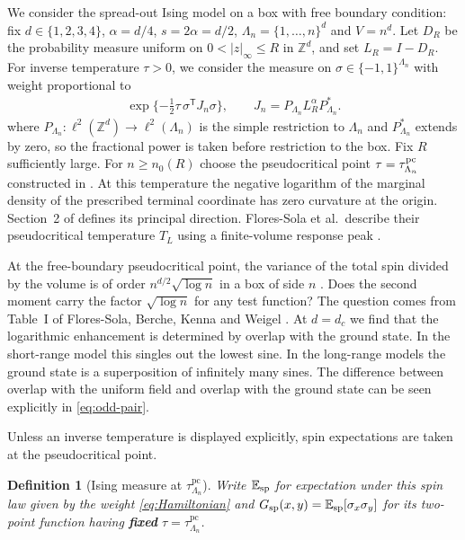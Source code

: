 \documentclass[11pt]{article}
\numberwithin{equation}{section}
\newtheorem{definition}[theorem]{Definition}
\newcommand{\E}{\mathbb E}
\begin{document}
We consider the spread-out Ising model on a box with free boundary condition:
fix $d\in\{1,2,3,4\}$, $\alpha=d/4$, $s=2\alpha=d/2$,
$\Lambda_n=\{1,\ldots,n\}^d$ and $V=n^d$.
Let $D_R$ be the probability measure uniform on $0<|z|_\infty\le R$ in
$\mathbb Z^d$, and set $L_R=I-D_R$.
For inverse temperature $\tau >0$, we consider the measure on $\sigma \in\{-1,1\}^{\Lambda_n}$
with weight proportional to
\begin{align}
 \exp\{-\tfrac12\tau\,\sigma^{\mathsf T}J_n\sigma\},\qquad
 J_n=P_{\Lambda_n} L_R^\alpha P_{\Lambda_n}^* .
 \label{eq:Hamiltonian}
\end{align}
where $P_{\Lambda_n} : \ell^2 (\mathbb{Z}^d) \rightarrow \ell^2 (\Lambda_n)$ 
is the simple restriction to $\Lambda_n$ and $P_{\Lambda_n}^*$ extends by zero, 
so the fractional power is taken before restriction to the box. 
Fix $R$ sufficiently large. 
For $n\ge n_0(R)$ choose the pseudocritical point
$\tau=\tau^{\rm pc}_{\Lambda_n}$ constructed in \cite{base}. At this
temperature the negative logarithm of the marginal density of the
prescribed terminal coordinate has zero curvature at the origin.
Section~2 of \cite{base} defines its principal direction.
Flores-Sola et al.\ describe their pseudocritical temperature $T_L$
using a finite-volume response peak \cite{flores}.

At the free-boundary pseudocritical point, the variance of the total
spin divided by the volume is of order $n^{d/2}\sqrt{\log n}$ in a box
of side $n$ \cite{base}. 
Does the second moment carry the factor $\sqrt{\log n}$ for any test function?
The question comes from Table~I of Flores-Sola, Berche, Kenna and
Weigel \cite{flores}.
At $d=d_c$ we find that the logarithmic enhancement is determined by overlap with the ground state. 
In the short-range model this singles out the lowest sine. In the long-range
models the ground state is a superposition of infinitely many sines.
The difference between overlap with the uniform field and overlap with
the ground state can be seen explicitly in \eqref{eq:odd-pair}.

Unless an inverse temperature is displayed explicitly, spin expectations
are taken at the pseudocritical point.

\begin{definition}[Ising measure at $\tau_{\Lambda_n}^{\mathrm{pc}}$]
Write $\E_{\rm sp}$ for expectation under this spin law given by the weight \eqref{eq:Hamiltonian}
and $G_{\rm sp}(x,y)=\E_{\rm sp}[\sigma_x\sigma_y]$ for its two-point function
having \emph{\textbf{fixed} $\tau = \tau_{\Lambda_n}^{\mathrm{pc}}$}.
\end{definition}
\end{document}
